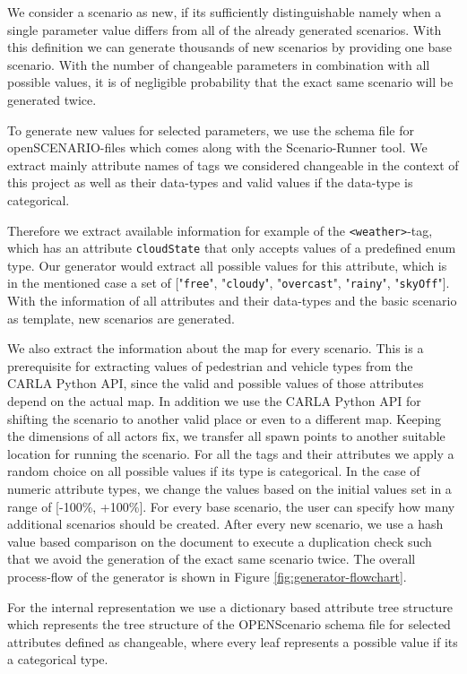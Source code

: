 \documentclass[conference, a4paper, 11pt]{IEEEtran}
\begin{document}
We consider a scenario as new, if its sufficiently distinguishable namely when a single parameter value differs from all of the already generated scenarios. With this definition we can generate thousands of new scenarios by providing one base scenario. With the number of changeable parameters in combination with all possible values, it is of negligible probability that the exact same scenario will be generated twice.

To generate new values for selected parameters, we use the schema file for openSCENARIO-files which comes along with the Scenario-Runner tool. We extract mainly attribute names of tags we considered changeable in the context of this project as well as their data-types and valid values if the data-type is categorical.

 Therefore we extract available information for example of the \texttt{<weather>}-tag, which has an attribute \texttt{cloudState} that only accepts values of a predefined enum type. Our generator would extract all possible values for this attribute,  which is in the mentioned case a set of ["\texttt{free}", "\texttt{cloudy}", "\texttt{overcast}", "\texttt{rainy}", "\texttt{skyOff}"]. With the information of all attributes and their data-types and the basic scenario as template, new scenarios are generated. 
 
 We also extract the information about the map for every scenario. This is a prerequisite for extracting values of pedestrian and vehicle types from the CARLA Python API, since the valid and possible values of those attributes depend on the actual map. In addition we use the CARLA Python API for shifting the scenario to another valid place or even to a different map. Keeping the dimensions of all actors fix, we transfer all spawn points to another suitable location for running the scenario.
 For all the tags and their attributes we apply a random choice on all possible values if its type is categorical. In the case of numeric attribute types, we change the values based on the initial values set in a range of [-100\%, +100\%].
 For every base scenario, the user can specify how many additional scenarios should be created. After every new scenario, we use a hash value based comparison on the document to execute a duplication check such that we avoid the generation of the exact same scenario twice.
The overall process-flow of the generator is shown in Figure \ref{fig:generator-flowchart}.

For the internal representation we use a dictionary based attribute tree structure which represents the tree structure of the OPENScenario schema file for selected attributes defined as changeable, where every leaf represents a possible value if its a categorical type.
\end{document}
